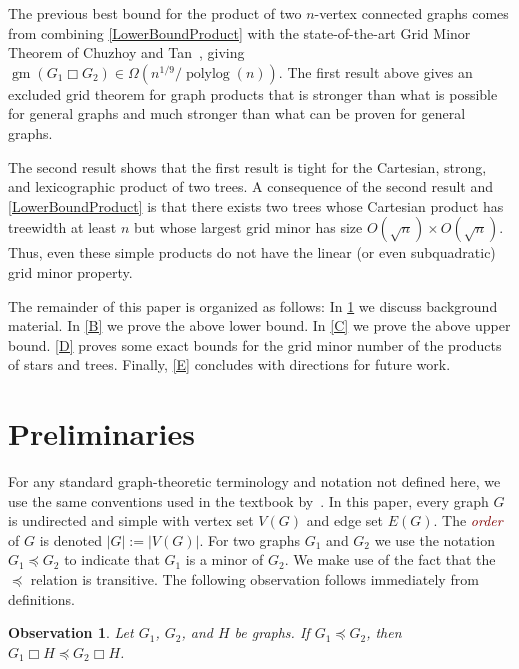 \documentclass{patmorin}
\newcommand{\defn}[1]{\textcolor{Maroon}{\emph{#1}}}
\newcommand{\boxprod}{\mathbin{\Box}}
\DeclareMathOperator{\polylog}{polylog}
\DeclareMathOperator{\gm}{gm}
\theoremstyle{plain}
\newtheorem{obs}[thm]{Observation}
\theoremstyle{definition}
\begin{document}
The previous best bound for the product of two $n$-vertex connected graphs comes from combining \eqref{LowerBoundProduct} with the state-of-the-art Grid Minor Theorem  of Chuzhoy and Tan~\cite{CT21}, giving $\gm(G_1 \boxprod G_2) \in \Omega(n^{1/9}/\polylog(n))$. The first result above gives an excluded grid theorem for graph products that is stronger than what is possible for general graphs and much stronger than what can be proven for general graphs. 


The second result shows that the first result is tight for the Cartesian, strong, and lexicographic product of two trees. %
A consequence of the second result and \eqref{LowerBoundProduct} is that there exists two trees whose Cartesian product has treewidth at least $n$ but whose largest grid minor has size $O(\sqrt{n})\times O(\sqrt{n})$. Thus, even these simple products do not have the linear (or even subquadratic) grid minor property. 

The remainder of this paper is organized as follows:  In \cref{A} we discuss background material. In \cref{B} we prove the above lower bound. In \cref{C} we prove the above upper bound. \cref{D} proves some exact bounds for the grid minor number of the products of stars and trees. Finally, \cref{E} concludes with directions for future work.

\section{Preliminaries}\label{A}

For any standard graph-theoretic terminology and notation not defined here, we use the same conventions used in the textbook by~\citet{D10}. In this paper, every graph $G$ is undirected and simple with vertex set $V(G)$ and edge set $E(G)$. The \defn{order} of $G$ is denoted $|G|:=|V(G)|$.  For two graphs $G_1$ and $G_2$ we use the notation $G_1\preceq G_2$ to indicate that $G_1$ is a minor of $G_2$.  We make use of the fact that the $\preceq$ relation is transitive. The following observation follows immediately from definitions.

\begin{obs}\label{minor_product}
  Let $G_1$, $G_2$, and $H$ be graphs.  If $G_1\preceq G_2$, then $G_1\boxprod H\preceq G_2\boxprod H$.
\end{obs}
\end{document}
